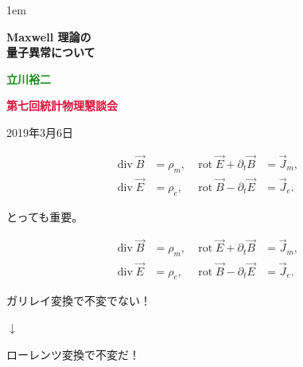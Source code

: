 \documentclass[xcolor={svgnames,rgb}]{beamer}
\date[]{}
\def\bff{\ifmmode\else\bfseries\fi}
\def\red#1{\textcolor{Crimson}{\bff #1}}
\def\green#1{\textcolor{ForestGreen}{\bff #1}}
\def\alert#1{\red{#1}}
\begin{document}
\parskip1em 
\boldmath
\def\baselinestretch{1.1}



\def\incb#1{\vcenter{\hbox{\texttt{[image: \#1]}}}}
\def\inc#1{\vcenter{\hbox{\texttt{[image: \#1]}}}}
\def\incc#1{\vcenter{\hbox{\texttt{[image: \#1]}}}}

\begin{frame}
\bigskip\bigskip\bigskip\bigskip\bigskip

\vfill


\begin{exampleblock}{}
\begin{center}\LARGE\bfseries
\color{math}
Maxwell 理論の\\
量子異常について
\end{center}
\end{exampleblock}

\bigskip\bigskip\bigskip
\begin{center}
\large  \green{立川裕二}  

\bigskip
\large \alert{第七回統計物理懇談会}

\bigskip
\large 2019年3月6日
\end{center}
\bigskip\bigskip\bigskip
\vfill


\end{frame}



\def\div{\mathop{\mathrm{div}}}
\def\rot{\mathop{\mathrm{rot}}}
\begin{frame}
\LARGE
\begin{align*}
\div \vec B&=\rho_m,  &\rot \vec E + \partial_t \vec B&=\vec J_m, \\
\div \vec E&=\rho_e, & \rot \vec B - \partial_t \vec E&=\vec J_e.
\end{align*}
\begin{center}

\bigskip\bigskip

とっても重要。
\end{center}

\end{frame}

\begin{frame}
\LARGE
\begin{align*}
\div \vec B&=\rho_m,  &\rot \vec E + \partial_t \vec B&=\vec J_m, \\
\div \vec E&=\rho_e, & \rot \vec B - \partial_t \vec E&=\vec J_e.
\end{align*}
\begin{center}
ガリレイ変換で不変でない！ 

$\downarrow$

ローレンツ変換で不変だ！
\end{center}

\end{frame}
\end{document}

